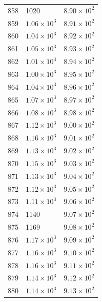 \begin{table}[H]
\begin{tabular}{lll}
858 & 1020 & $\displaystyle 8.90 \times 10^{2}$ \\
859 & $\displaystyle 1.06 \times 10^{3}$ & $\displaystyle 8.91 \times 10^{2}$ \\
860 & $\displaystyle 1.04 \times 10^{3}$ & $\displaystyle 8.92 \times 10^{2}$ \\
861 & $\displaystyle 1.05 \times 10^{3}$ & $\displaystyle 8.93 \times 10^{2}$ \\
862 & $\displaystyle 1.01 \times 10^{3}$ & $\displaystyle 8.94 \times 10^{2}$ \\
863 & $\displaystyle 1.00 \times 10^{3}$ & $\displaystyle 8.95 \times 10^{2}$ \\
864 & $\displaystyle 1.04 \times 10^{3}$ & $\displaystyle 8.96 \times 10^{2}$ \\
865 & $\displaystyle 1.07 \times 10^{3}$ & $\displaystyle 8.97 \times 10^{2}$ \\
866 & $\displaystyle 1.08 \times 10^{3}$ & $\displaystyle 8.98 \times 10^{2}$ \\
867 & $\displaystyle 1.12 \times 10^{3}$ & $\displaystyle 9.00 \times 10^{2}$ \\
868 & $\displaystyle 1.16 \times 10^{3}$ & $\displaystyle 9.01 \times 10^{2}$ \\
869 & $\displaystyle 1.13 \times 10^{3}$ & $\displaystyle 9.02 \times 10^{2}$ \\
870 & $\displaystyle 1.15 \times 10^{3}$ & $\displaystyle 9.03 \times 10^{2}$ \\
871 & $\displaystyle 1.13 \times 10^{3}$ & $\displaystyle 9.04 \times 10^{2}$ \\
872 & $\displaystyle 1.12 \times 10^{3}$ & $\displaystyle 9.05 \times 10^{2}$ \\
873 & $\displaystyle 1.11 \times 10^{3}$ & $\displaystyle 9.06 \times 10^{2}$ \\
874 & 1140 & $\displaystyle 9.07 \times 10^{2}$ \\
875 & 1169 & $\displaystyle 9.08 \times 10^{2}$ \\
876 & $\displaystyle 1.17 \times 10^{3}$ & $\displaystyle 9.09 \times 10^{2}$ \\
877 & $\displaystyle 1.16 \times 10^{3}$ & $\displaystyle 9.10 \times 10^{2}$ \\
878 & $\displaystyle 1.16 \times 10^{3}$ & $\displaystyle 9.11 \times 10^{2}$ \\
879 & $\displaystyle 1.14 \times 10^{3}$ & $\displaystyle 9.12 \times 10^{2}$ \\
880 & $\displaystyle 1.14 \times 10^{3}$ & $\displaystyle 9.13 \times 10^{2}$ \\

\end{tabular}
\end{table}
